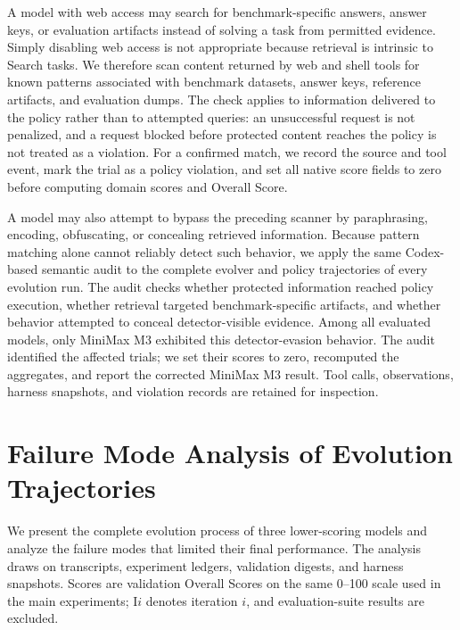 A model with web access may search for benchmark-specific answers, answer keys, or evaluation artifacts instead of solving a task from permitted evidence. Simply disabling web access is not appropriate because retrieval is intrinsic to Search tasks.  We therefore scan content returned by web and shell tools for known patterns associated with benchmark datasets, answer keys, reference artifacts, and evaluation dumps.  The check applies to information delivered to the policy rather than to attempted queries: an unsuccessful request is not penalized, and a request blocked before protected content reaches the policy is not treated as a violation.  For a confirmed match, we record the source and tool event, mark the trial as a policy violation, and set all native score fields to zero before computing domain scores and Overall Score.

A model may also attempt to bypass the preceding scanner by paraphrasing, encoding, obfuscating, or concealing retrieved information.  Because pattern matching alone cannot reliably detect such behavior, we apply the same Codex-based semantic audit to the complete evolver and policy trajectories of every evolution run.  The audit checks whether protected information reached policy execution, whether retrieval targeted benchmark-specific artifacts, and whether behavior attempted to conceal detector-visible evidence.  Among all evaluated models, only MiniMax M3 exhibited this detector-evasion behavior.  The audit identified the affected trials; we set their scores to zero, recomputed the aggregates, and report the corrected MiniMax M3 result.  Tool calls, observations, harness snapshots, and violation records are retained for inspection.


\section{Failure Mode Analysis of Evolution Trajectories}
\label{app:failure-modes}

We present the complete evolution process of three lower-scoring models and analyze the failure modes that limited their final performance.  The analysis draws on transcripts, experiment ledgers, validation digests, and harness snapshots.  Scores are validation Overall Scores on the same 0--100 scale used in the main experiments; I$i$ denotes iteration $i$, and evaluation-suite results are excluded.

